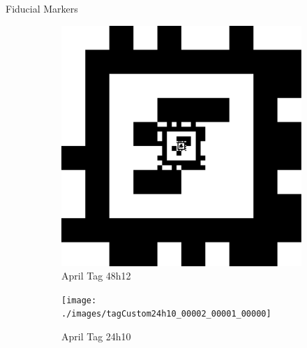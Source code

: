\documentclass[aspectratio=169]{beamer}
\begin{document}
\begin{frame}{Fiducial Markers}
	\vspace*{\fill}
	\begin{figure}[]
	    \centering
	    \begin{subfigure}[b]{0.23\linewidth}
		\includegraphics[width=\textwidth]{./images/tagCustom48h12_00002_00001_00000}
		    \caption{April Tag 48h12~\cite{apriltag3_paper}}
		\label{figure:apriltag48h12}
	    \end{subfigure}
		\hspace{0.01\linewidth}
	    \begin{subfigure}[b]{0.23\linewidth}
		\texttt{[image: ./images/tagCustom24h10\_00002\_00001\_00000]}
		    \caption{April Tag 24h10~\cite{fiducial_precursor_evaluation}}
		\label{figure:apriltag24h10}
	    \end{subfigure}
		\hspace{0.01\linewidth}
	    \begin{subfigure}[b]{0.23\linewidth}

\end{subfigure}
\end{figure}
\end{frame}
\end{document}
